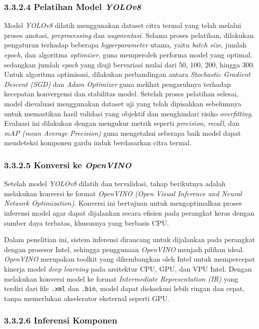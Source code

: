 \subsubsection{3.3.2.4 Pelatihan Model \emph{YOLOv8}}

Model \emph{YOLOv8} dilatih menggunakan dataset citra termal yang telah melalui proses anotasi, \emph{preprocessing} dan \emph{augmentasi}. Selama proses pelatihan, dilakukan pengaturan terhadap beberapa \emph{hyperparameter} utama, yaitu \emph{batch size}, jumlah \emph{epoch}, dan algoritma \emph{optimizer}, guna memperoleh performa model yang optimal. sedangkan jumlah \emph{epoch} yang diuji bervariasi mulai dari 50, 100, 200, hingga 300. Untuk algoritma optimisasi, dilakukan perbandingan antara \emph{Stochastic Gradient Descent (SGD)} dan \emph{Adam Optimizer} guna melihat pengaruhnya terhadap kecepatan konvergensi dan stabilitas model.  Setelah proses pelatihan selesai, model dievaluasi menggunakan dataset uji yang telah dipisahkan sebelumnya untuk memastikan hasil validasi yang objektif dan menghindari risiko \emph{overfitting}. Evaluasi ini dilakukan dengan mengukur metrik seperti \emph{precision}, \emph{recall}, dan \emph{mAP (mean Average Precision)} guna mengetahui seberapa baik model dapat mendeteksi komponen gardu induk berdasarkan citra termal.


\subsubsection{3.3.2.5 Konversi ke \emph{OpenVINO}}
Setelah model \emph{YOLOv8} dilatih dan tervalidasi, tahap berikutnya adalah melakukan konversi ke format \emph{OpenVINO (Open Visual Inference and Neural Network Optimization)}. Konversi ini bertujuan untuk mengoptimalkan proses inferensi model agar dapat dijalankan secara efisien pada perangkat keras dengan sumber daya terbatas, khususnya yang berbasis CPU.

Dalam penelitian ini, sistem inferensi dirancang untuk dijalankan pada perangkat dengan prosesor Intel, sehingga penggunaan \emph{OpenVINO} menjadi pilihan ideal. \emph{OpenVINO} merupakan toolkit yang dikembangkan oleh Intel untuk mempercepat kinerja model \emph{deep learning} pada arsitektur CPU, GPU, dan VPU Intel. Dengan melakukan konversi model ke format \emph{Intermediate Representation (IR)} yang terdiri dari file \texttt{.xml} dan \texttt{.bin}, model dapat dieksekusi lebih ringan dan cepat, tanpa memerlukan akselerator eksternal seperti GPU.

\subsubsection{3.3.2.6 Inferensi Komponen}


